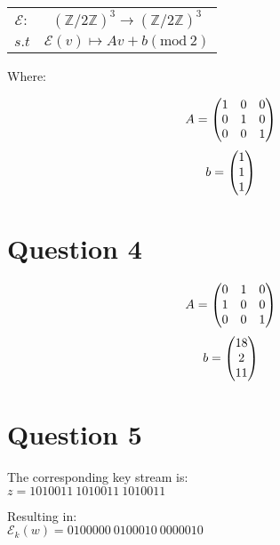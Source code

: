 \documentclass{article}
\numberwithin{equation}{subsection}
\begin{document}
	\begin{center}
		
	\begin{tabular}{c c}	
	$\mathcal{E}:$ & $ (\mathbb{Z}/2\mathbb{Z})^3 \rightarrow  (\mathbb{Z}/2\mathbb{Z})^3$\\
	$s.t$ & $\mathcal{E}(v) \mapsto Av + b (\textrm{mod}\ 2)$
	\end{tabular}	
	\end{center}
	
	Where:

	\begin{equation}\notag
			A = \begin{pmatrix}
				1 & 0 & 0 \\
				0 & 1 & 0 \\
				0 & 0 & 1
		\end{pmatrix}
	\end{equation}
	\begin{equation}\notag
		b = \begin{pmatrix}
			1 \\ 1 \\ 1
		\end{pmatrix}	
	\end{equation}

	\newpage
	\thispagestyle{fancy}

	\section*{Question 4}
	\begin{equation}\notag
		A = \begin{pmatrix}
			0 & 1 & 0 \\
			1 & 0 & 0 \\
			0 & 0 & 1
		\end{pmatrix}	
	\end{equation}
	\begin{equation}\notag
		b = \begin{pmatrix}
			18 \\ 2 \\ 11
		\end{pmatrix}	
	\end{equation}

	\vspace{30pt}
	\section*{Question 5}
	\par{
		The corresponding key stream is:\\
		$z = 1010011 \ 1010011 \ 1010011$
	}
	
	\par{
		Resulting in:\\
		$\mathcal{E}_k(w) = 0100000 \ 0100010 \ 0000010$
	}
	
\end{document}
